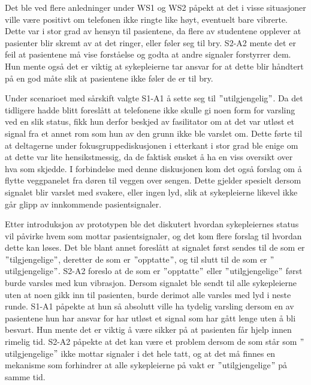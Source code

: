 \noindent
Det ble ved flere anledninger under WS1 og WS2 påpekt at det i visse situasjoner ville være positivt om telefonen ikke ringte like høyt, eventuelt bare vibrerte. Dette var i stor grad av hensyn til pasientene, da flere av studentene opplever at pasienter blir skremt av at det ringer, eller føler seg til bry. S2-A2 mente det er feil at pasientene må vise forståelse og godta at andre signaler forstyrrer dem. Hun mente også det er viktig at sykepleierne tar ansvar for at dette blir håndtert på en god måte slik at pasientene ikke føler de er til bry. 

\noindent
Under scenarioet med sårskift valgte S1-A1 å sette seg til $"$utilgjengelig$"$. Da det tidligere hadde blitt foreslått at telefonene ikke skulle gi noen form for varsling ved en slik status, fikk hun derfor beskjed av fasilitator om at det var utløst et signal fra et annet rom som hun av den grunn ikke ble varslet om. Dette førte til at deltagerne under fokusgruppediskusjonen i etterkant i stor grad ble enige om at dette var lite hensikstmessig, da de faktisk ønsket å ha en viss oversikt over hva som skjedde. I forbindelse med denne diskusjonen kom det også forslag om å flytte veggpanelet fra døren til veggen over sengen. Dette gjelder spesielt dersom signalet blir varslet med svakere, eller ingen lyd, slik at sykepleierne likevel ikke går glipp av innkommende pasientsignaler.

\noindent
Etter introduksjon av prototypen ble det diskutert hvordan sykepleiernes status vil påvirke hvem som mottar pasientsignaler, og det kom flere forslag til hvordan dette kan løses. Det ble blant annet foreslått at signalet først sendes til de som er $"$tilgjengelige$"$, deretter de som er $"$opptatte$"$, og til slutt til de som er $"$utilgjengelige$"$. S2-A2 foreslo at de som er $"$opptatte$"$ eller $"$utilgjengelige$"$ først burde varsles med kun vibrasjon. Dersom signalet ble sendt til alle sykepleierne uten at noen gikk inn til pasienten, burde derimot alle varsles med lyd i neste runde. S1-A1 påpekte at hun så absolutt ville ha tydelig varsling dersom en av pasientene hun har ansvar for har utløst et signal som har gått lenge uten å bli besvart. Hun mente det er viktig å være sikker på at pasienten får hjelp innen rimelig tid. S2-A2 påpekte at det kan være et problem dersom de som står som $"$utilgjengelige$"$ ikke mottar signaler i det hele tatt,  og at det må finnes en mekanisme som forhindrer at alle sykepleierne på vakt er $"$utilgjengelige$"$ på samme tid. 